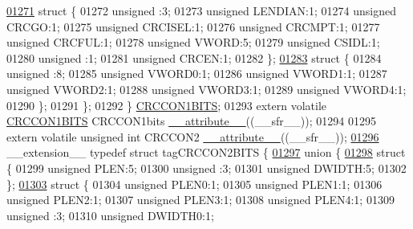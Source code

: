 \begin{DoxyCode}
\hypertarget{a00009_source_l01271}{}\hyperlink{a00009}{01271}     \textcolor{keyword}{struct }\{
01272       \textcolor{keywordtype}{unsigned} :3;
01273       \textcolor{keywordtype}{unsigned} LENDIAN:1;
01274       \textcolor{keywordtype}{unsigned} CRCGO:1;
01275       \textcolor{keywordtype}{unsigned} CRCISEL:1;
01276       \textcolor{keywordtype}{unsigned} CRCMPT:1;
01277       \textcolor{keywordtype}{unsigned} CRCFUL:1;
01278       \textcolor{keywordtype}{unsigned} VWORD:5;
01279       \textcolor{keywordtype}{unsigned} CSIDL:1;
01280       \textcolor{keywordtype}{unsigned} :1;
01281       \textcolor{keywordtype}{unsigned} CRCEN:1;
01282     \};
\hypertarget{a00009_source_l01283}{}\hyperlink{a00009}{01283}     \textcolor{keyword}{struct }\{
01284       \textcolor{keywordtype}{unsigned} :8;
01285       \textcolor{keywordtype}{unsigned} VWORD0:1;
01286       \textcolor{keywordtype}{unsigned} VWORD1:1;
01287       \textcolor{keywordtype}{unsigned} VWORD2:1;
01288       \textcolor{keywordtype}{unsigned} VWORD3:1;
01289       \textcolor{keywordtype}{unsigned} VWORD4:1;
01290     \};
01291   \};
01292 \} \hyperlink{a00008_d0/d48/a00351}{CRCCON1BITS};
01293 \textcolor{keyword}{extern} \textcolor{keyword}{volatile} \hyperlink{a00008_d0/d48/a00351}{CRCCON1BITS} CRCCON1bits \hyperlink{a00009_a493c46f03454991ccc5aa7a6e1dfb2a7}{\_\_attribute\_\_}((\_\_sfr\_\_));
01294 
01295 \textcolor{keyword}{extern} \textcolor{keyword}{volatile} \textcolor{keywordtype}{unsigned} \textcolor{keywordtype}{int}  CRCCON2 \hyperlink{a00009_a493c46f03454991ccc5aa7a6e1dfb2a7}{\_\_attribute\_\_}((\_\_sfr\_\_));
\hypertarget{a00009_source_l01296}{}\hyperlink{a00008}{01296} \_\_extension\_\_ \textcolor{keyword}{typedef} \textcolor{keyword}{struct }tagCRCCON2BITS \{
\hypertarget{a00009_source_l01297}{}\hyperlink{a00009}{01297}   \textcolor{keyword}{union }\{
\hypertarget{a00009_source_l01298}{}\hyperlink{a00009}{01298}     \textcolor{keyword}{struct }\{
01299       \textcolor{keywordtype}{unsigned} PLEN:5;
01300       \textcolor{keywordtype}{unsigned} :3;
01301       \textcolor{keywordtype}{unsigned} DWIDTH:5;
01302     \};
\hypertarget{a00009_source_l01303}{}\hyperlink{a00009}{01303}     \textcolor{keyword}{struct }\{
01304       \textcolor{keywordtype}{unsigned} PLEN0:1;
01305       \textcolor{keywordtype}{unsigned} PLEN1:1;
01306       \textcolor{keywordtype}{unsigned} PLEN2:1;
01307       \textcolor{keywordtype}{unsigned} PLEN3:1;
01308       \textcolor{keywordtype}{unsigned} PLEN4:1;
01309       \textcolor{keywordtype}{unsigned} :3;
01310       \textcolor{keywordtype}{unsigned} DWIDTH0:1;

\end{DoxyCode}
